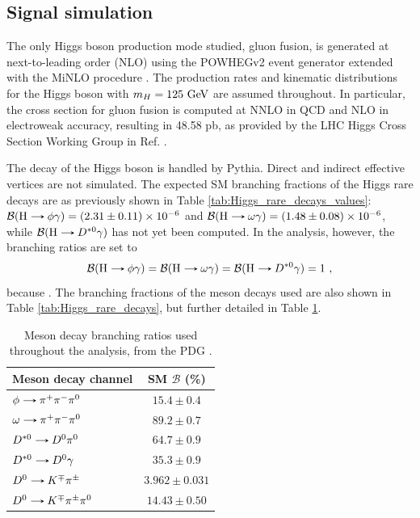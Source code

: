 \subsection{Signal simulation}

The only Higgs boson production mode studied, gluon fusion, is generated at next-to-leading order (NLO) using the POWHEGv2 event generator extended with the MiNLO procedure \cite{Hamilton:2012np}. The production rates and kinematic distributions for the Higgs boson with $m_H=125\ \text{GeV}$ are assumed throughout. In particular, the cross section for gluon fusion is computed at NNLO in QCD and NLO in electroweak accuracy, resulting in 48.58 pb, as provided by the LHC Higgs Cross Section Working Group in Ref. \cite{LHCHiggsCrossSectionWorkingGroup:2016ypw}.

The decay of the Higgs boson is handled by Pythia. Direct and indirect effective vertices are not simulated. The expected SM branching fractions of the Higgs rare decays are as previously shown in Table \ref{tab:Higgs_rare_decays_values}: $\mathcal{B}(\text{H}\decaysto \phi\gamma) = (2.31 \pm 0.11)\times 10^{-6}$ and $\mathcal{B}(\text{H}\decaysto \omega\gamma) = (1.48 \pm 0.08)\times 10^{-6}$, while $\mathcal{B}(\text{H}\decaysto D^{*0}\gamma)$ has not yet been computed. In the analysis, however, the branching ratios are set to
\begin{equation*}
    \mathcal{B}(\text{H}\decaysto \phi\gamma) = \mathcal{B}(\text{H}\decaysto \omega\gamma) = \mathcal{B}(\text{H}\decaysto D^{*0}\gamma) = 1\ ,
\end{equation*}
because . The branching fractions of the meson decays used are also shown in Table \ref{tab:Higgs_rare_decays}, but further detailed in Table \ref{tab:Meson_decay_br}.

\begin{table}[!ht]
    \centering
    \begin{tabular}{|l|c|}
        \hline
        \multicolumn{1}{|c|}{\cellcolor{lightgray}Meson decay channel} & \multicolumn{1}{c|}{\cellcolor{lightgray} SM $\mathcal{B}$ (\%)} \\ \hline
        $\phi\decaysto \pi^+\pi^-\pi^0$     & $15.4 \pm 0.4$   \\
        $\omega\decaysto \pi^+\pi^-\pi^0$   & $89.2 \pm 0.7$   \\
        $D^{*0}\decaysto D^{0}\pi^0$        & $64.7 \pm 0.9$   \\
        $D^{*0}\decaysto D^{0}\gamma$       & $35.3 \pm 0.9$   \\
        $D^{0}\decaysto K^{\mp}\pi^{\pm}$           & $3.962 \pm 0.031$   \\
        $D^{0}\decaysto K^{\mp}\pi^{\pm}\pi^0$      & $14.43 \pm 0.50$   \\
        \hline
    \end{tabular}
    \caption{Meson decay branching ratios used throughout the analysis, from the PDG \cite{PDG}.}
    \label{tab:Meson_decay_br}
\end{table}


